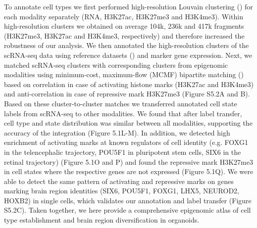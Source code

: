 To annotate cell types we first performed high-resolution Louvain clustering (\cite{blondel_fast_2008}) for each modality separately (RNA, H3K27ac, H3K27me3 and H3K4me3). Within high-resolution clusters we obtained on average 104k, 236k and 417k fragments (H3K27me3, H3K27ac and H3K4me3, respectively) and therefore increased the robustness of our analysis. We then annotated the high-resolution clusters of the scRNA-seq data using reference datasets (\cite{kanton_organoid_2019,fleck_inferring_2021}) and marker gene expression. Next, we matched scRNA-seq clusters with corresponding clusters from epigenomic modalities using minimum-cost, maximum-flow (MCMF) bipartite matching (\cite{stark_scim_2020}) based on correlation in case of activating histone marks (H3K27ac and H3K4me3) and anti-correlation in case of repressive mark H3K27me3 (Figure S5.2A and B). Based on these cluster-to-cluster matches we transferred annotated cell state labels from scRNA-seq to other modalities. We found that after label transfer, cell type and state distribution was similar between all modalities, supporting the accuracy of the integration (Figure 5.1L-M). In addition, we detected high enrichment of activating marks at known regulators of cell identity (e.g. FOXG1 in the telencephalic trajectory, POU5F1 in pluripotent stem cells, SIX6 in the retinal trajectory) (Figure 5.1O and P) and found the repressive mark H3K27me3 in cell states where the respective genes are not expressed (Figure 5.1Q). We were able to detect the same pattern of activating and repressive marks on genes marking brain region identities (SIX6, POU5F1, FOXG1, LHX5, NEUROD2, HOXB2) in single cells, which validates our annotation and label transfer (Figure S5.2C). Taken together, we here provide a comprehensive epigenomic atlas of cell type establishment and brain region diversification in organoids.

